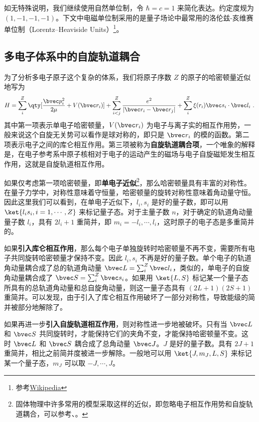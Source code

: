 

如无特殊说明，我们继续使用自然单位制，令 $\hbar=c=1$ 来简化表达。约定度规为 $(1,-1,-1,-1)$。下文中电磁单位制采用的是量子场论中最常用的洛伦兹-亥维赛单位制（Lorentz–Heaviside Units）\footnote{参考\href{https://en.wikipedia.org/wiki/Heaviside\%E2\%80\%93Lorentz_units}{Wikipedia}}。


\subsection{多电子体系中的自旋轨道耦合}
\cite{黄昆}为了分析多电子原子这个复杂的体系，我们将原子序数 $Z$ 的原子的哈密顿量近似地写为
\begin{equation}
H=\sum_{i}^{Z} \qty[\frac{\bvec p_i^2}{2\mu} +V(\bvec r_i)]+\sum_{i<j}^Z \frac{e^2}{|\bvec r_i-\bvec r_j|}+\sum_i^Z \xi(r_i)\bvec s_i\cdot \bvec l_i~.
\end{equation}
其中第一项表示单电子哈密顿量，$V(\bvec r_i)$ 为电子与离子实的相互作用势，一般来说这个自旋无关势可以看作是球对称的，即只是 $\bvec r_i$ 的模的函数。第二项表示电子之间的库仑相互作用。第三项被称为\textbf{自旋轨道耦合项}，一个唯象的解释是，在电子参考系中原子核相对于电子的运动产生的磁场与电子自旋磁矩发生相互作用，这就是自旋轨道相互作用。

如果仅考虑第一项哈密顿量，即\textbf{单电子近似}\footnote{固体物理中许多常用的模型采取这样的近似，即忽略电子相互作用势和自旋轨道耦合，可以参考、。}，那么哈密顿量具有丰富的对称性。在量子力学中，对称性意味着守恒量，哈密顿量的旋转对称性意味着角动量守恒。因此这里我们可以看到，在单电子近似下，$l_i,s_i$ 是好的量子数，即可以用 $\ket{l_is_i,i=1,\cdots,Z}$ 来标记量子态。对于主量子数 $n$，对于确定的轨道角动量量子数 $l_i$，具有 $2 l_i+1$ 重简并，即 $m_{i}=-l_i,\cdots,l_i$，这时原子的电子态是多重简并的。

如果\textbf{引入库仑相互作用}，那么每个电子单独旋转时哈密顿量不再不变，需要所有电子共同旋转哈密顿量才保持不变。因此 $l_i,s_i$ 不再是好的量子数。单个电子的轨道角动量耦合成了总的轨道角动量 $\bvec L=\sum_i^Z \bvec l_i$，类似的，单电子的自旋角动量耦合成了 $\bvec S=\sum_i^Z \bvec s_i$。如果用 $\ket{L,S}$ 标记某一个量子态所具有的总轨道角动量和总自旋角动量，则这一量子态具有 $(2L+1)(2S+1)$ 重简并。可以发现，由于引入了库仑相互作用破坏了一部分对称性，导致能级的简并被部分地解除了。

如果再进一步\textbf{引入自旋轨道相互作用}，则对称性进一步地被破坏。只有当 $\bvec L$ 和 $\bvec S$ 共同旋转时，才能保持它们的夹角不变，才能保持哈密顿量不变。这时 $\bvec L$ 和 $\bvec S$ 耦合成了总角动量 $\bvec J$。$J$ 是好的量子数。具有 $2J+1$ 重简并，相比之前简并度被进一步解除。一般地可以用 $\ket{J,m_J,L,S}$ 来标记某一个量子态，$m_J$ 可以取 $-J,\cdots,J$。
